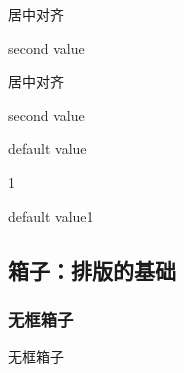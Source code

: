 \documentclass{ctexart}
\begin{document}
            \newenvironment{newenv2}[2][default value]
            {\newcommand{\firstvalue}{#1}
            \newcommand{\secondvalue}{#2}
            \begin{center}\firstvalue\par}
            {\par\secondvalue\end{center}}

            \begin{newenv2}[first value]{second value}
                居中对齐
            \end{newenv2}

            \begin{newenv2}{second value}
                居中对齐
            \end{newenv2}


            \newcommand{\newcd}[1][default value]{#1}
            \newcd 

            \newcd[1]

            \newcd{1}

    \subsection{箱子：排版的基础}
        \subsubsection{无框箱子}
            \mbox{无框箱子}
\end{document}
